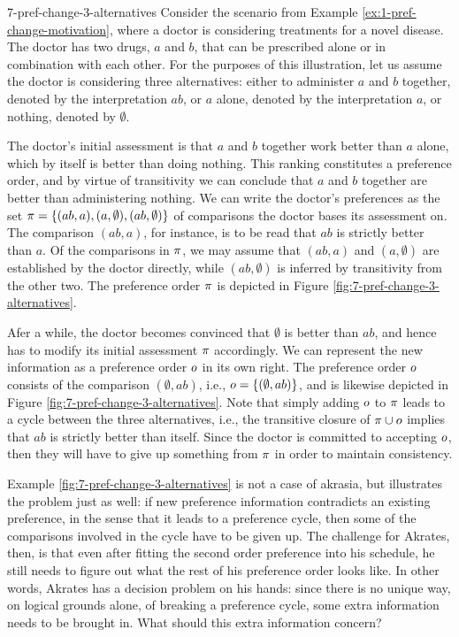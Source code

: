 \begin{xmpl}{}{7-pref-change-3-alternatives}
	Consider the scenario from Example \ref{ex:1-pref-change-motivation},
	where a doctor is considering treatments for a novel disease. The 
	doctor has two drugs, $a$ and $b$, that can be prescribed alone 
	or in combination with each other. For the purposes of this illustration,
	let us assume the doctor is considering three alternatives:
	either to administer $a$ and $b$ together, denoted by the interpretation $ab$,
	or $a$ alone, denoted by the interpretation $a$,
	or nothing, denoted by $\emptyset$.

	The doctor's initial assessment is that 
	$a$ and $b$ together work better than $a$ alone, which 
	by itself is better than doing nothing.
	This ranking constitutes a preference order, 
	and by virtue of transitivity we can conclude 
	that $a$ and $b$ together are better
	than administering nothing.
	We can write the doctor's preferences as the set 
	$\pi=\{(ab,a),(a,\emptyset),(ab,\emptyset)\}$
	of comparisons the doctor bases its assessment on.
	The comparison $(ab,a)$, for instance, is to be read 
	that $ab$ is strictly better than $a$.
	Of the comparisons in $\pi$, we may assume that $(ab,a)$ and $(a,\emptyset)$
	are established by the doctor directly,
	while $(ab,\emptyset)$ is inferred by transitivity from the other two.
	The preference order $\pi$ is depicted in Figure \ref{fig:7-pref-change-3-alternatives}.

	Afer a while, the doctor becomes convinced that $\emptyset$ is better than $ab$,
	and hence has to modify its initial assessment $\pi$ accordingly.
	We can represent the new information as a preference order $o$ in its own right.
	The preference order $o$ consists of the comparison $(\emptyset,ab)$,
	i.e., $o=\{(\emptyset, ab)\}$, 
	and is likewise depicted in Figure \ref{fig:7-pref-change-3-alternatives}.
	Note that simply adding $o$ to $\pi$
	leads to a cycle between the three alternatives,
	i.e., the transitive closure of $\pi\cup o$ implies that 
	$ab$ is strictly better than itself.
	Since the doctor is committed to accepting $o$,
	then they will have to give up something from $\pi$ in order to maintain 
	consistency. 	
\end{xmpl}

Example \ref{fig:7-pref-change-3-alternatives} is not a case of akrasia,
but illustrates the problem just as well:
if new preference information contradicts an existing preference,
in the sense that it leads to a preference cycle,
then some of the comparisons involved in the cycle have to be given up.
The challenge for Akrates, then, is that even after fitting 
the second order preference into his schedule,
he still needs to figure out what the rest of his preference order
looks like. In other words, Akrates has a decision problem on his hands:
since there is no unique way, on logical grounds alone, 
of breaking a preference cycle, some extra information needs to be brought in.
What should this extra information concern?

